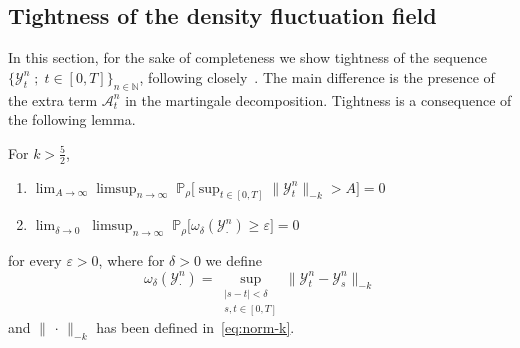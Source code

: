 \documentclass[AHL,Unicode,longabstracts]{cedram}
\newcommand{\mc}[1]{{\mathcal #1}}
\renewcommand{\mc}[1]{{\mathcal #1}}
\renewcommand{\geq}{\geqslant}
\renewcommand{\epsilon}{\varepsilon}
\begin{document}
\subsection{Tightness of the density fluctuation field}\label{sec:tightness}

In this section, for the sake of completeness we show tightness of the sequence $\{{\mathcal Y}_t^n\; ; \; t \in [0,T]\}_{n\in\mathbb{N}}$, following closely~\cite{kl}. The main difference is the presence of the extra term $\mc A_t^n$ in the martingale decomposition. Tightness is a consequence of the following lemma.

\begin{lemm}\label{lem:tight}
For $k>\frac52$,
\begin{enumerate}
\item \label{4.4.1} $\displaystyle\lim_{A\rightarrow{\infty}}\limsup_{n\rightarrow{\infty}}\; \mathbb{P}_{\rho}\Big[\sup_{t\in[0,T]}\|{{\mathcal Y}}_{t}^{n}\|_{-k}>A\Big]=0$
\item \label{4.4.2} $\displaystyle \lim_{\delta\rightarrow{0}}\; \limsup_{n\rightarrow{\infty}}\;\mathbb{P}_{\rho}\Big[\omega_{\delta} ({{\mathcal Y}}_{\cdot}^{n})\geq{\epsilon}\Big]=0$
\end{enumerate}
for every $\epsilon>0$, where for $\delta>0$ we define
\begin{equation*}
\omega_{\delta}({\mathcal{Y}}_{\cdot}^{n})=\sup_{\substack{|s-t|<\delta\\s,t \in [0,T]}}\|{\mathcal Y}_{t}^{n}-{{\mathcal Y}}_{s}^{n}\|_{-k}
\end{equation*}
and $\|{\,\cdot\,}\|_{-k}$ has been defined in~\eqref{eq:norm-k}.
\end{lemm}
\end{document}
